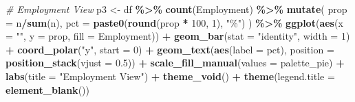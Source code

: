\documentclass[
]{article}
\newenvironment{Shaded}{\begin{snugshade}}{\end{snugshade}}
\newcommand{\AttributeTok}[1]{\textcolor[rgb]{0.13,0.29,0.53}{#1}}
\newcommand{\CommentTok}[1]{\textcolor[rgb]{0.56,0.35,0.01}{\textit{#1}}}
\newcommand{\DecValTok}[1]{\textcolor[rgb]{0.00,0.00,0.81}{#1}}
\newcommand{\FloatTok}[1]{\textcolor[rgb]{0.00,0.00,0.81}{#1}}
\newcommand{\FunctionTok}[1]{\textcolor[rgb]{0.13,0.29,0.53}{\textbf{#1}}}
\newcommand{\NormalTok}[1]{#1}
\newcommand{\OtherTok}[1]{\textcolor[rgb]{0.56,0.35,0.01}{#1}}
\newcommand{\SpecialCharTok}[1]{\textcolor[rgb]{0.81,0.36,0.00}{\textbf{#1}}}
\newcommand{\StringTok}[1]{\textcolor[rgb]{0.31,0.60,0.02}{#1}}
\begin{document}
\begin{Shaded}
\begin{Highlighting}[]
\CommentTok{\# Employment View}
\NormalTok{p3 }\OtherTok{\textless{}{-}}\NormalTok{ df }\SpecialCharTok{\%\textgreater{}\%}
  \FunctionTok{count}\NormalTok{(Employment) }\SpecialCharTok{\%\textgreater{}\%}
  \FunctionTok{mutate}\NormalTok{(}
    \AttributeTok{prop =}\NormalTok{ n}\SpecialCharTok{/}\FunctionTok{sum}\NormalTok{(n),}
    \AttributeTok{pct =} \FunctionTok{paste0}\NormalTok{(}\FunctionTok{round}\NormalTok{(prop }\SpecialCharTok{*} \DecValTok{100}\NormalTok{, }\DecValTok{1}\NormalTok{), }\StringTok{"\%"}\NormalTok{)}
\NormalTok{  ) }\SpecialCharTok{\%\textgreater{}\%}
  \FunctionTok{ggplot}\NormalTok{(}\FunctionTok{aes}\NormalTok{(}\AttributeTok{x =} \StringTok{""}\NormalTok{, }\AttributeTok{y =}\NormalTok{ prop, }\AttributeTok{fill =}\NormalTok{ Employment)) }\SpecialCharTok{+}
  \FunctionTok{geom\_bar}\NormalTok{(}\AttributeTok{stat =} \StringTok{"identity"}\NormalTok{, }\AttributeTok{width =} \DecValTok{1}\NormalTok{) }\SpecialCharTok{+}
  \FunctionTok{coord\_polar}\NormalTok{(}\StringTok{"y"}\NormalTok{, }\AttributeTok{start =} \DecValTok{0}\NormalTok{) }\SpecialCharTok{+}
  \FunctionTok{geom\_text}\NormalTok{(}\FunctionTok{aes}\NormalTok{(}\AttributeTok{label =}\NormalTok{ pct), }\AttributeTok{position =} \FunctionTok{position\_stack}\NormalTok{(}\AttributeTok{vjust =} \FloatTok{0.5}\NormalTok{)) }\SpecialCharTok{+}
  \FunctionTok{scale\_fill\_manual}\NormalTok{(}\AttributeTok{values =}\NormalTok{ palette\_pie) }\SpecialCharTok{+}
  \FunctionTok{labs}\NormalTok{(}\AttributeTok{title =} \StringTok{"Employment View"}\NormalTok{) }\SpecialCharTok{+}
  \FunctionTok{theme\_void}\NormalTok{() }\SpecialCharTok{+}
  \FunctionTok{theme}\NormalTok{(}\AttributeTok{legend.title =} \FunctionTok{element\_blank}\NormalTok{())}


\end{Highlighting}
\end{Shaded}
\end{document}

